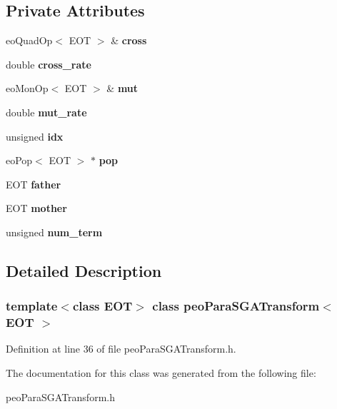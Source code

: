 \subsection*{Private Attributes}
\begin{CompactItemize}
\item 
eo\-Quad\-Op$<$ EOT $>$ \& \bf{cross}\label{classpeo_para_s_g_a_transform_c6f97deabe7502c84f5b6c479013f6dc}

\item 
double \bf{cross\_\-rate}\label{classpeo_para_s_g_a_transform_dfcf216e2df05016db4d57a5ffb0b0e2}

\item 
eo\-Mon\-Op$<$ EOT $>$ \& \bf{mut}\label{classpeo_para_s_g_a_transform_34ff5f9d285ca4879cf8865fb425a311}

\item 
double \bf{mut\_\-rate}\label{classpeo_para_s_g_a_transform_b9d3a2094737d0bbd034aac942cc53e3}

\item 
unsigned \bf{idx}\label{classpeo_para_s_g_a_transform_03972feadc86626e58fe60bd4061b57e}

\item 
eo\-Pop$<$ EOT $>$ $\ast$ \bf{pop}\label{classpeo_para_s_g_a_transform_94e10a1285e128aba6e71517c941f961}

\item 
EOT \bf{father}\label{classpeo_para_s_g_a_transform_9ef60190e2e3bd5961a93d1b52cb275d}

\item 
EOT \bf{mother}\label{classpeo_para_s_g_a_transform_e991ad2af6d116afd855de2db46e1d27}

\item 
unsigned \bf{num\_\-term}\label{classpeo_para_s_g_a_transform_589ea7cd72d522ae51a07de4d8ffbf11}

\end{CompactItemize}


\subsection{Detailed Description}
\subsubsection*{template$<$class EOT$>$ class peo\-Para\-SGATransform$<$ EOT $>$}





Definition at line 36 of file peo\-Para\-SGATransform.h.

The documentation for this class was generated from the following file:\begin{CompactItemize}
\item 
peo\-Para\-SGATransform.h\end{CompactItemize}
